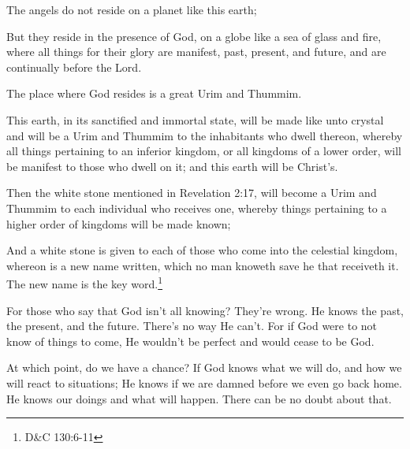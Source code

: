 \begin{displayquote}
The angels do not reside on a planet like this earth;

But they reside in the presence of God, on a globe like a sea of glass and fire, 
where all things for their glory are manifest, past, present, and future, and are 
continually before the Lord.

The place where God resides is a great Urim and Thummim.

This earth, in its sanctified and immortal state, will be made like unto crystal and 
will be a Urim and Thummim to the inhabitants who dwell thereon, whereby all things 
pertaining to an inferior kingdom, or all kingdoms of a lower order, will be manifest 
to those who dwell on it; and this earth will be Christ's.

Then the white stone mentioned in Revelation 2:17, will become a Urim and Thummim to 
each individual who receives one, whereby things pertaining to a higher order of 
kingdoms will be made known;

And a white stone is given to each of those who come into the celestial kingdom, 
whereon is a new name written, which no man knoweth save he that receiveth it. The 
new name is the key word.\footnote{D\&C 130:6-11}
\end{displayquote}

For those who say that God isn't all knowing? They're wrong. He knows the past, the
present, and the future. There's no way He can't. For if God were to not know of
things to come, He wouldn't be perfect and would cease to be God.

At which point, do we have a chance? If God knows what we will do, and how we will
react to situations; He knows if we are damned before we even go back home. He knows
our doings and what will happen. There can be no doubt about that.